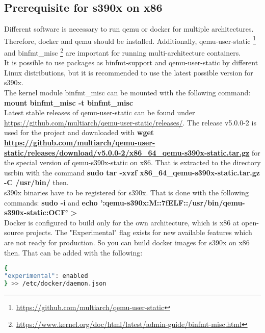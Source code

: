 \subsection{Prerequisite for s390x on x86}

Different software is necessary to run qemu or docker for multiple architectures. Therefore, docker and qemu should be installed. Additionally, qemu-user-static \footnote{\url{https://github.com/multiarch/qemu-user-static}} and binfmt\_misc \footnote{\url{https://www.kernel.org/doc/html/latest/admin-guide/binfmt-misc.html}} are important for running multi-architecture containers. \\

It is possible to use packages as binfmt-support and qemu-user-static by different Linux distributions, but it is recommended to use the latest possible version for s390x. \\

The kernel module binfmt\_misc can be mounted with the following command: \textbf{mount binfmt_misc -t binfmt\_misc } \\

Latest stable releases of qemu-user-static can be found under \url{https://github.com/multiarch/qemu-user-static/releases/}. The release v5.0.0-2 is used for the project and downloaded with \textbf{wget \url{https://github.com/multiarch/qemu-user-static/releases/download/v5.0.0-2/x86_64_qemu-s390x-static.tar.gz}} for the special version of qemu-s390x-static on x86. That is extracted to the directory \/usr\/bin\/ with the command \textbf{sudo tar -xvzf x86_64_qemu-s390x-static.tar.gz -C /usr/bin/} then. \\

s390x binaries have to be registered for s390x. That is done with the following commands: \textbf{sudo -i} and \textbf{echo ':qemu-s390x:M::\x7fELF:\xff\xff\xff\xff\xff\xff\xff{}\xff\xff\xff\xff\xff\xff\xff\xff\xff\xfe\xff\xff:/usr/bin/qemu-s390x-static:OCF' > } \\

Docker is configured to build only for the own architecture, which is x86 at open-source projects. The "Experimental" flag exists for new available features which are not ready for production. So you can build docker images for s390x on x86 then. That can be added with the following:

\begin{lstlisting}[language=Bash,caption={This is an example of inline listing},captionpos=b]
{
"experimental": enabled
} >> /etc/docker/daemon.json
\end{lstlisting}

